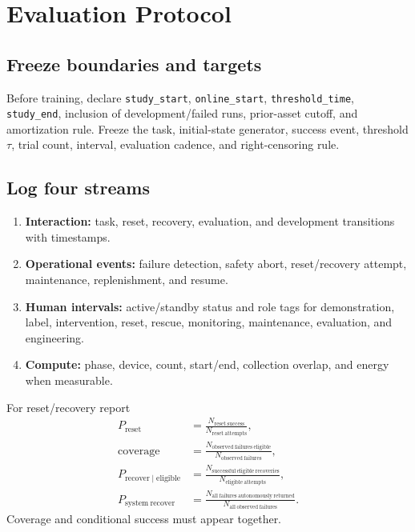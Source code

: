 \documentclass[11pt]{article}
\begin{document}
\section{Evaluation Protocol}

\subsection{Freeze boundaries and targets}

Before training, declare \texttt{study\_start}, \texttt{online\_start}, \texttt{threshold\_time}, \texttt{study\_end}, inclusion of development/failed runs, prior-asset cutoff, and amortization rule. Freeze the task, initial-state generator, success event, threshold $\tau$, trial count, interval, evaluation cadence, and right-censoring rule.

\subsection{Log four streams}

\begin{enumerate}
    \item \textbf{Interaction:} task, reset, recovery, evaluation, and development transitions with timestamps.
    \item \textbf{Operational events:} failure detection, safety abort, reset/recovery attempt, maintenance, replenishment, and resume.
    \item \textbf{Human intervals:} active/standby status and role tags for demonstration, label, intervention, reset, rescue, monitoring, maintenance, evaluation, and engineering.
    \item \textbf{Compute:} phase, device, count, start/end, collection overlap, and energy when measurable.
\end{enumerate}

For reset/recovery report
\begin{align}
P_{\mathrm{reset}} &= \frac{N_{\mathrm{reset\ success}}}{N_{\mathrm{reset\ attempts}}},\\
\mathrm{coverage} &= \frac{N_{\mathrm{observed\ failures\ eligible}}}{N_{\mathrm{observed\ failures}}},\\
P_{\mathrm{recover}\mid\mathrm{eligible}} &=
\frac{N_{\mathrm{successful\ eligible\ recoveries}}}{N_{\mathrm{eligible\ attempts}}},\\
P_{\mathrm{system\ recover}} &=
\frac{N_{\mathrm{all\ failures\ autonomously\ returned}}}{N_{\mathrm{all\ observed\ failures}}}.
\end{align}
Coverage and conditional success must appear together.
\end{document}

